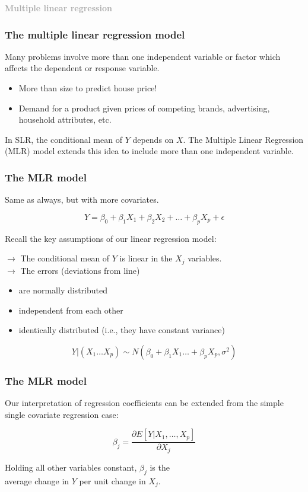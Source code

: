 \documentclass{beamer}
\newcommand{\dg}[1]{\textcolor{darkgray}{#1}}
\newcommand{\bl}{\color{lightblue}}
\newcommand{\rd}{\color{burntorange}}
\newcommand{\bk}{\color{black}}
\newcommand{\bi}{\begin{itemize}}
\newcommand{\ib}{\end{itemize}}
\newcommand{\p}{\item}
\newcommand{\sk}{\vspace{.5cm}}
\begin{document}
\begin{frame}
\sk\sk
	\dg{\bf Multiple linear regression }
\end{frame}


\begin{frame}
\frametitle{The multiple linear regression model}

Many problems involve more than one independent variable 
or factor which affects the dependent or response variable.

\sk
\bi 
\p More than size to predict house price!
\p Demand for a product given prices of competing brands, 
advertising, household attributes, etc.
\ib 

\sk
In SLR, the conditional mean of $Y$ depends on $X$. The 
Multiple Linear Regression (MLR) model extends this idea to include more 
than one independent variable.
\end{frame}

\begin{frame}
\frametitle{The MLR model}

\sk
Same as always, but with more covariates.

{\bl  \large
\[ Y = \beta_0 + \beta_1 X_1 + \beta_2 X_2 + \dots + \beta_p X_p + \epsilon 
\]}

Recall the key assumptions of our linear regression model: \\ \sk


$\rightarrow$ The conditional mean of $Y$ is \rd linear \bk in the $X_j$ variables. \\ \sk
$\rightarrow$  The errors (deviations from line) \\ 
\begin{itemize}
	\item are normally distributed \vspace{-2mm}
	\item independent from each other \vspace{-2mm}
	\item identically distributed (i.e., they have constant variance) \vspace{-2mm}
\end{itemize} 


{\bl  \large 
\[ Y |(X_1\ldots X_p) \sim N(\beta_0 + \beta_1 X_1 \ldots + \beta_p X_p, \sigma^2)
\]}

\end{frame}



\begin{frame}
\frametitle{The MLR model}  

Our interpretation of regression coefficients can be extended from the
simple  single covariate regression case: \sk

{\bl  \large 
\[ \beta_j = \frac{\partial E[Y | X_1,\ldots,X_p]}{\partial X_j} \] }
\sk
\begin{center}\rd \vspace{-.3cm}
Holding all other variables constant\bk, $\beta_j$ is the \\
average  change in $Y$ per unit change in $X_j$.
\end{center}

\end{frame}
\end{document}
